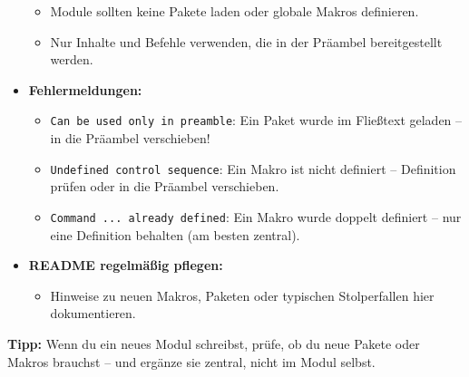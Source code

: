 \begin{itemize}
  \begin{itemize}
  \tightlist
  \item
    Module sollten keine Pakete laden oder globale Makros definieren.
  \item
    Nur Inhalte und Befehle verwenden, die in der Präambel bereitgestellt werden.
  \end{itemize}
\item
  \textbf{Fehlermeldungen:}

  \begin{itemize}
  \tightlist
  \item
    \texttt{Can\ be\ used\ only\ in\ preamble}: Ein Paket wurde im Fließtext geladen -- in die Präambel verschieben!
  \item
    \texttt{Undefined\ control\ sequence}: Ein Makro ist nicht definiert -- Definition prüfen oder in die Präambel verschieben.
  \item
    \texttt{Command\ ...\ already\ defined}: Ein Makro wurde doppelt definiert -- nur eine Definition behalten (am besten zentral).
  \end{itemize}
\item
  \textbf{README regelmäßig pflegen:}

  \begin{itemize}
  \tightlist
  \item
    Hinweise zu neuen Makros, Paketen oder typischen Stolperfallen hier dokumentieren.
  \end{itemize}
\end{itemize}

\textbf{Tipp:}
Wenn du ein neues Modul schreibst, prüfe, ob du neue Pakete oder Makros brauchst -- und ergänze sie zentral, nicht im Modul selbst.
